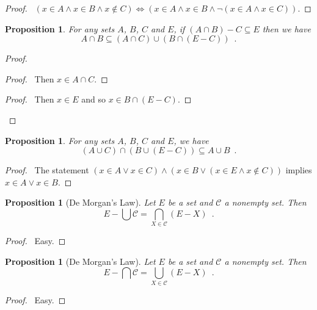 \documentclass{report}
\let\qed\relax
\newtheorem{prop}[ax]{Proposition}
\theoremstyle{definition}
\begin{document}
\begin{proof}
\pf\ $(x \in A \wedge x \in B \wedge x \notin C) \Leftrightarrow (x \in A \wedge x \in B \wedge \neg (x \in A \wedge x \in C))$. \qed
\end{proof}

\begin{prop}
For any sets $A$, $B$, $C$ and $E$, if $(A \cap B) - C \subseteq E$ then we have
\[ A \cap B \subseteq (A \cap C) \cup (B \cap (E - C)) \enspace . \]
\end{prop}

\begin{proof}
\pf
{}
\begin{proof}
	\pf\ Then $x \in A \cap C$.
\end{proof}
\begin{proof}
	\pf\ Then $x \in E$ and so $x \in B \cap (E - C)$.
\end{proof}
\qed
\end{proof}

\begin{prop}
For any sets $A$, $B$, $C$ and $E$, we have
\[ (A \cup C) \cap (B \cup (E - C)) \subseteq A \cup B \enspace . \]
\end{prop}

\begin{proof}
\pf\ The statement $(x \in A \vee x \in C) \wedge (x \in B \vee (x \in E \wedge x \notin C))$ implies $x \in A \vee x \in B$. \qed
\end{proof}

\begin{prop}[De Morgan's Law]
Let $E$ be a set and $\mathcal{C}$ a nonempty set. Then
\[ E - \bigcup \mathcal{C} = \bigcap_{X \in \mathcal{C}} (E - X) \enspace . \]
\end{prop}

\begin{proof}
\pf\ Easy. \qed
\end{proof}

\begin{prop}[De Morgan's Law]
Let $E$ be a set and $\mathcal{C}$ a nonempty set. Then
\[ E - \bigcap \mathcal{C} = \bigcup_{X \in \mathcal{C}} (E - X) \enspace . \]
\end{prop}

\begin{proof}
\pf\ Easy. \qed
\end{proof}
\end{document}
